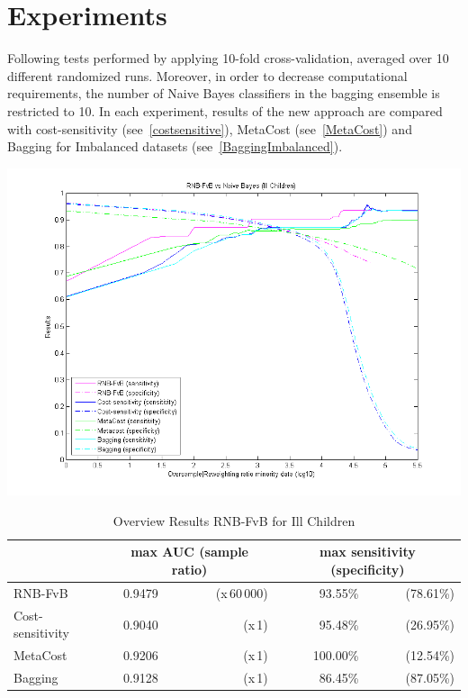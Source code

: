 

\newpage
\section{Experiments}
Following tests performed by applying 10-fold cross-validation, averaged over 10 different randomized runs. Moreover, in order to decrease computational requirements, the number of Naive Bayes classifiers in the bagging ensemble is restricted to 10. In each experiment, results of the new approach are compared with cost-sensitivity (see~\ref{costsensitive}), MetaCost (see~\ref{MetaCost}) and Bagging for Imbalanced datasets (see~\ref{BaggingImbalanced}).

\includegraphics[scale=0.65]{img/RNB-FvB-illchildren.png}
 
\begin{table}[h]
\centering  
\begin{tabular}{ l | c r | r r|}                                      
& \multicolumn{2}{c}{max AUC (sample ratio)} & \multicolumn{2}{c}{max sensitivity (specificity)} \\
\hline 
RNB-FvB & 0.9479 & (x\,60\,000) & 93.55\% & (78.61\%)\\
Cost-sensitivity & 0.9040 & (x\,1) & 95.48\% & (26.95\%)\\
MetaCost & 0.9206 & (x\,1) & 100.00\% & (12.54\%)\\
Bagging & 0.9128 & (x\,1) & 86.45\% & (87.05\%)\\
\hline                          %
\end{tabular}
\label{tab:PPer}
\caption{Overview Results RNB-FvB for Ill Children} %
\end{table}
 




